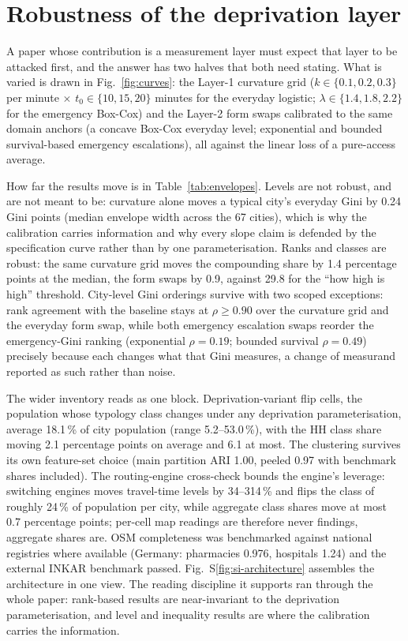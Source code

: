 \documentclass[11pt]{article}
\begin{document}
\section{Robustness of the deprivation layer}\label{si:robustness}

A paper whose contribution is a measurement layer must expect that layer
to be attacked first, and the answer has two halves that both need
stating. What is varied is drawn in Fig.~\ref{fig:curves}: the Layer-1
curvature grid ($k \in \{0.1, 0.2, 0.3\}$ per minute $\times$
$t_0 \in \{10, 15, 20\}$ minutes for the everyday logistic;
$\lambda \in \{1.4, 1.8, 2.2\}$ for the emergency Box-Cox) and the
Layer-2 form swaps calibrated to the same domain anchors (a concave
Box-Cox everyday level; exponential and bounded survival-based emergency
escalations), all against the linear loss of a pure-access average.

How far the results move is in Table~\ref{tab:envelopes}. Levels are not
robust, and are not meant to be: curvature alone moves a typical city's
everyday Gini by 0.24 Gini points (median envelope width across the 67
cities), which is why the calibration carries information and why
every slope claim is defended by the specification curve rather than by
one parameterisation. Ranks and classes are robust: the same curvature
grid moves the compounding share by 1.4 percentage points at the median,
the form swaps by 0.9, against 29.8 for the ``how high is high''
threshold. City-level Gini orderings survive with two scoped exceptions:
rank agreement with the baseline stays at $\rho \geq 0.90$ over the
curvature grid and the everyday form swap, while both emergency
escalation swaps reorder the emergency-Gini ranking (exponential
$\rho = 0.19$; bounded survival $\rho = 0.49$) precisely because each
changes what that Gini measures, a change of measurand reported as such
rather than noise.

The wider inventory reads as one block. Deprivation-variant flip cells,
the population whose typology class changes under any deprivation
parameterisation, average 18.1\,\% of city population (range
5.2--53.0\,\%), with the HH class share moving 2.1 percentage points on
average and 6.1 at most. The clustering survives its own feature-set
choice (main partition ARI 1.00, peeled 0.97 with benchmark shares
included). The routing-engine cross-check bounds the engine's leverage:
switching engines moves travel-time levels by 34--314\,\% and flips the
class of roughly 24\,\% of population per city, while aggregate class
shares move at most 0.7 percentage points; per-cell map readings are
therefore never findings, aggregate shares are. OSM completeness was
benchmarked against national registries where available (Germany:
pharmacies 0.976, hospitals 1.24) and the external INKAR benchmark
passed. Fig.~S\ref{fig:si-architecture} assembles the architecture in one view. The reading
discipline it supports ran through the whole paper: rank-based results
are near-invariant to the deprivation parameterisation, and level and
inequality results are where the calibration carries the information.
\end{document}
